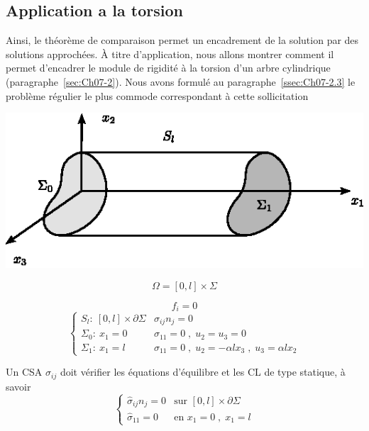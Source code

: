 \subsection{Application a la torsion} \label{ssec:Ch09-1.4}
Ainsi, le théorème de comparaison permet un encadrement de la solution par des solutions approchées.
À titre d'application, nous allons montrer comment il permet d'encadrer le module de rigidité à la torsion d'un arbre cylindrique (paragraphe~\ref{sec:Ch07-2}).
Nous avons formulé au paragraphe~\ref{ssec:Ch07-2.3} le problème régulier le plus commode correspondant à cette sollicitation 
\begin{multicols}{2}
    \begin{center}
        \includegraphics{../images/T1_Ch09-01}
    \end{center}
    \[
        \Omega = [0,l]\times \Sigma
    \]
\end{multicols}
\[
f_i = 0
\]
\begin{equation}
    \left\{
    \begin{aligned}
        S_l:\ [0,l] \times \partial \Sigma & \sigma_{ij} n_j = 0 \\
        \Sigma_0:\ x_1 = 0 & \sigma_{11} = 0 \;,\; u_2 = u_3 = 0 \\
        \Sigma_1:\ x_1 = l & \sigma_{11} = 0 \;,\; u_2 = -\alpha l x_3 \;,\; u_3 = \alpha l x_2
    \end{aligned}
    \right.
    \label{eq:Ch09-033}
\end{equation}

Un CSA $\hat{\sigma}_{ij}$ doit vérifier les équations d'équilibre et les CL de type statique, à savoir
\begin{equation}
    \left\{
    \begin{aligned}
        \hat{\sigma}_{ij} n_j = 0 & \text{sur } [0,l] \times \partial \Sigma \\
        \hat{\sigma}_{11} = 0 & \text{en } x_1= 0 \;,\; x_1=l
    \end{aligned}
    \right.
    \label{eq:Ch09-034}
\end{equation}

